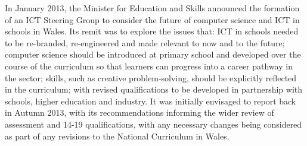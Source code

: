 \documentclass{llncs}
\begin{document}




In January 2013, the Minister for Education and Skills
announced the formation of an ICT Steering Group to consider
the future of computer science and ICT in schools in Wales.
Its remit was to explore the issues that: ICT in schools needed to be
re-branded, re-engineered and made relevant to now and to the future;
computer science should be introduced at primary school and developed
over the course of the curriculum so that learners can progress into a
career pathway in the sector; skills, such as creative
problem-solving, should be explicitly reflected in the curriculum;
with revised qualifications to be developed in partnership with
schools, higher education and industry.  It was initially envisaged to
report back in Autumn 2013, with its recommendations informing the
wider review of assessment and 14-19
qualifications, with any necessary changes
being considered as part of any revisions to the National Curriculum
in Wales.
\end{document}

